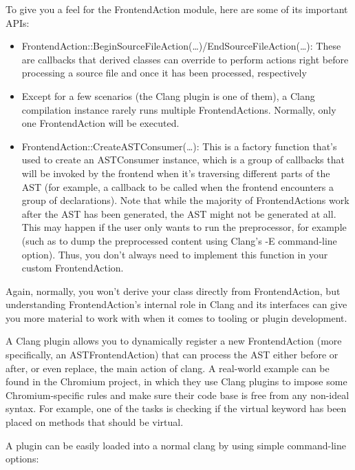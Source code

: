 To give you a feel for the FrontendAction module, here are some of its important APIs:

\begin{itemize}
\item FrontendAction::BeginSourceFileAction(…)/EndSourceFileAction(…): These are callbacks that derived classes can override to perform actions right before processing a source file and once it has been processed, respectively

\item Except for a few scenarios (the Clang plugin is one of them), a Clang compilation instance rarely runs multiple FrontendActions. Normally, only one FrontendAction will be executed.

\item FrontendAction::CreateASTConsumer(…): This is a factory function that's used to create an ASTConsumer instance, which is a group of callbacks that will be invoked by the frontend when it's traversing different parts of the AST (for example, a callback to be called when the frontend encounters a group of declarations). Note that while the majority of FrontendActions work after the AST has been generated, the AST might not be generated at all. This may happen if the user only wants to run the preprocessor, for example (such as to dump the preprocessed content using Clang's -E command-line option). Thus, you don't always need to implement this function in your custom FrontendAction.
\end{itemize}

Again, normally, you won't derive your class directly from FrontendAction, but understanding FrontendAction's internal role in Clang and its interfaces can give you more material to work with when it comes to tooling or plugin development.


A Clang plugin allows you to dynamically register a new FrontendAction (more specifically, an ASTFrontendAction) that can process the AST either before or after, or even replace, the main action of clang. A real-world example can be found in the Chromium project, in which they use Clang plugins to impose some Chromium-specific rules and make sure their code base is free from any non-ideal syntax. For example, one of the tasks is checking if the virtual keyword has been placed on methods that should be virtual.

A plugin can be easily loaded into a normal clang by using simple command-line options:

